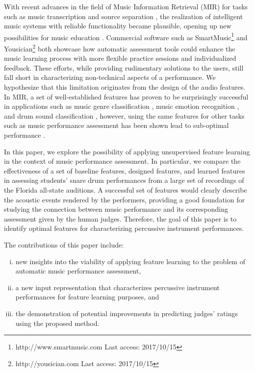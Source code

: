 \documentclass{ws-ijsc}
\begin{document}
With recent advances in the field of Music Information Retrieval (MIR) for tasks such as music transcription \cite{Benetos2013} and source separation \cite{Huang2014}, the realization of intelligent music systems with reliable functionality became plausible, opening up new possibilities for music education \cite{Dittmar2012}. Commercial software such as SmartMusic\footnote{http://www.smartmusic.com Last access: 2017/10/15} and Yousician\footnote{http://yousician.com Last access: 2017/10/15} both showcase how automatic assessment tools could enhance the music learning process with more flexible practice sessions and individualized feedback. These efforts, while providing rudimentary solutions to the users, still fall short in characterizing non-technical aspects of a performance. We hypothesize that this limitation originates from the design of the audio features. In MIR, a set of well-established features has proven to be surprisingly successful in applications such as music genre classification \cite{Tzanetakis2002}, music emotion recognition \cite{Kim2010}, and drum sound classification \cite{Herrera2003}, however, using the same features for other tasks such as music performance assessment has been shown lead to sub-optimal performance \cite{Wu2016,Vidwans2017}. %

In this paper, we explore the possibility of applying unsupervised feature learning in the context of music performance assessment. In particular, we compare the effectiveness of a set of baseline features, designed features, and learned features in assessing students' snare drum performances from a large set of recordings of the Florida all-state auditions. 
{{A successful set of features would clearly describe the acoustic events rendered by the performers, providing a good foundation for studying the connection between music performance and its corresponding assessment given by the human judges.}}
Therefore, the goal of this paper is to identify optimal features for characterizing percussive instrument performances.

The contributions of this paper include:
\begin{enumerate}[(i)]
	\item   new insights into the viability of applying feature learning to the problem of automatic music performance assessment, 
    \item   a new input representation that characterizes percussive instrument performances for feature learning purposes, and 
    \item   the demonstration of potential improvements in predicting judges' ratings using the proposed method.
\end{enumerate} 
\end{document}
